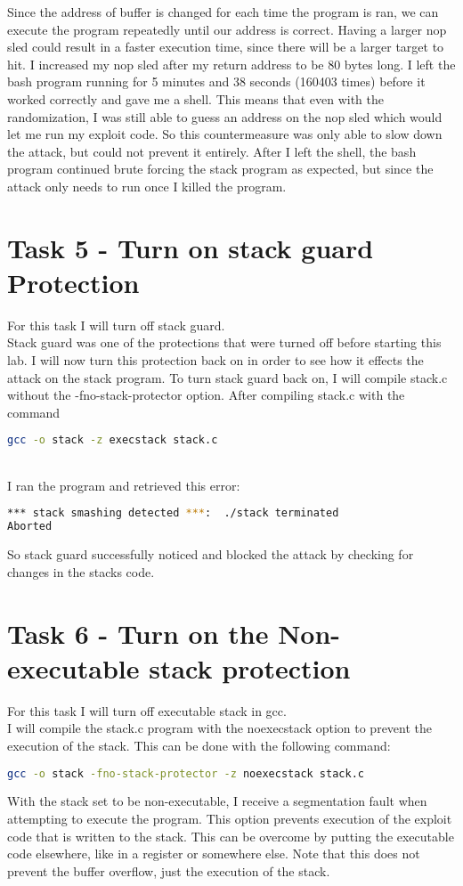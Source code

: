 \documentclass[14pt]{extarticle}
\begin{document}
Since the address of buffer is changed for each time the program is ran, we can execute the program repeatedly until our address is correct. Having a larger nop sled could result in a faster execution time, since there will be a larger target to hit.
I increased my nop sled after my return address to be 80 bytes long. I left the bash program running for 5 minutes and 38 seconds (160403 times) before it worked correctly and gave me a shell. This means that even with the randomization, I was still able to guess an address on the nop sled which would let me run my exploit code. So this countermeasure was only able to slow down the attack, but could not prevent it entirely. After I left the shell, the bash program continued brute forcing the stack program as expected, but since the attack only needs to run once I killed the program.

\section{Task 5 - Turn on stack guard Protection}
For this task I will turn off stack guard.\\
Stack guard was one of the protections that were turned off before starting this lab. I will now turn this protection back on in order to see how it effects the attack on the stack program.
To turn stack guard back on, I will compile stack.c without the -fno-stack-protector option.
After compiling stack.c with the command
\begin{lstlisting}[language=sh]
gcc -o stack -z execstack stack.c
\end{lstlisting}\cite{seed-bof}\\
I ran the program and retrieved this error:
\begin{lstlisting}[language=sh]
*** stack smashing detected ***:  ./stack terminated
Aborted
\end{lstlisting}
So stack guard successfully noticed and blocked the attack by checking for changes in the stacks code.
\section{Task 6 - Turn on the Non-executable stack protection}
For this task I will turn off executable stack in gcc.\\
I will compile the stack.c program with the noexecstack option to prevent the execution of the stack. This can be done with the following command:
\begin{lstlisting}[language=sh]
gcc -o stack -fno-stack-protector -z noexecstack stack.c
\end{lstlisting}
With the stack set to be non-executable, I receive a segmentation fault when attempting to execute the program. This option prevents execution of the exploit code that is written to the stack. This can be overcome by putting the executable code elsewhere, like in a register or somewhere else. Note that this does not prevent the buffer overflow, just the execution of the stack\cite{seed-bof}.

\newpage


\end{document}
